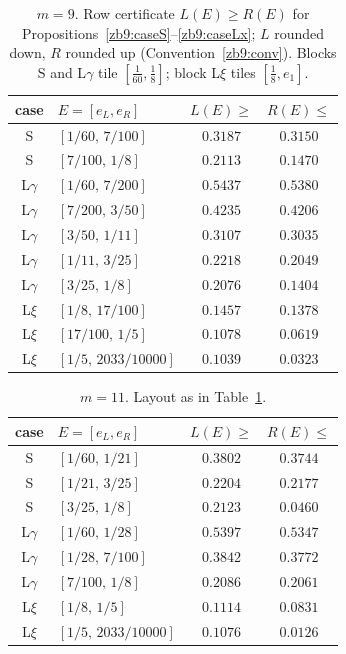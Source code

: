 \documentclass[11pt]{article}
\theoremstyle{remark}
\begin{document}
\begin{table}[h]\centering
\caption{$m=9$.  Row certificate $L(E)\ge R(E)$ for
Propositions~\ref{zb9:caseS}--\ref{zb9:caseLx}; $L$ rounded down, $R$ rounded
up (Convention~\ref{zb9:conv}).  Blocks S and L$\gamma$ tile
$[\tfrac1{60},\tfrac18]$; block L$\xi$ tiles $[\tfrac18,e_1]$.}\label{zb9:tab9}
\begin{tabular}{clcc}
\toprule
case & $E=[e_L,e_R]$ & $L(E)\ge$ & $R(E)\le$\\
\midrule
S       & $[1/60,\,7/100]$   & $0.3187$ & $0.3150$\\
S       & $[7/100,\,1/8]$    & $0.2113$ & $0.1470$\\
\midrule
L$\gamma$ & $[1/60,\,7/200]$ & $0.5437$ & $0.5380$\\
L$\gamma$ & $[7/200,\,3/50]$ & $0.4235$ & $0.4206$\\
L$\gamma$ & $[3/50,\,1/11]$  & $0.3107$ & $0.3035$\\
L$\gamma$ & $[1/11,\,3/25]$  & $0.2218$ & $0.2049$\\
L$\gamma$ & $[3/25,\,1/8]$   & $0.2076$ & $0.1404$\\
\midrule
L$\xi$  & $[1/8,\,17/100]$   & $0.1457$ & $0.1378$\\
L$\xi$  & $[17/100,\,1/5]$   & $0.1078$ & $0.0619$\\
L$\xi$  & $[1/5,\,2033/10000]$ & $0.1039$ & $0.0323$\\
\bottomrule
\end{tabular}
\end{table}

\begin{table}[h]\centering
\caption{$m=11$.  Layout as in Table~\ref{zb9:tab9}.}\label{zb9:tab11}
\begin{tabular}{clcc}
\toprule
case & $E=[e_L,e_R]$ & $L(E)\ge$ & $R(E)\le$\\
\midrule
S       & $[1/60,\,1/21]$    & $0.3802$ & $0.3744$\\
S       & $[1/21,\,3/25]$    & $0.2204$ & $0.2177$\\
S       & $[3/25,\,1/8]$     & $0.2123$ & $0.0460$\\
\midrule
L$\gamma$ & $[1/60,\,1/28]$  & $0.5397$ & $0.5347$\\
L$\gamma$ & $[1/28,\,7/100]$ & $0.3842$ & $0.3772$\\
L$\gamma$ & $[7/100,\,1/8]$  & $0.2086$ & $0.2061$\\
\midrule
L$\xi$  & $[1/8,\,1/5]$      & $0.1114$ & $0.0831$\\
L$\xi$  & $[1/5,\,2033/10000]$ & $0.1076$ & $0.0126$\\
\bottomrule
\end{tabular}
\end{table}
\end{document}
